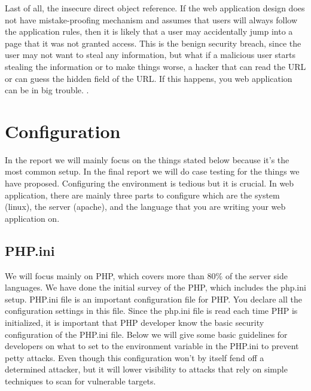 \documentclass[conference]{IEEEtran}
\begin{document}
Last of all, the insecure direct object reference. If the web application design does not have mistake-proofing mechanism and assumes that users will always follow the application rules, 
then it is likely that a user may accidentally jump into a page that it was not granted access. This is the benign security breach, since the user may not want to steal any information, 
but what if a malicious user starts stealing the information or to make things worse, a hacker that can read the URL or can guess the hidden field of the URL\cite{Michael}. 
If this happens, you web application can be in big trouble.  \cite{Test}.

\section{Configuration}
In the report we will mainly focus on the things stated below
because it's the most common setup. In the final report we will do case testing for the things we have proposed.
Configuring the environment is tedious but it is crucial. In web application, there are mainly three parts to configure
which are the system (linux), the server (apache), and the language that you are writing your web application on.

%


\subsection{PHP.ini}
We will focus mainly on PHP, which covers more than $80\%$ \cite{PHPusuage} of the server side languages. We have done the initial
survey of the PHP, which includes the php.ini setup.
PHP.ini file is an important configuration file for PHP. You declare all the configuration settings in this file. Since the php.ini file is read each time PHP is initialized, it is important that
PHP developer know the basic security configuration of the PHP.ini file. Below we will give some basic guidelines for developers on what to set to the environment variable in the PHP.ini
to prevent petty attacks. Even though this configuration won't by itself fend off a determined attacker, but it will lower visibility to attacks that rely on simple techniques to scan for vulnerable targets\cite{phpini}.
 
\end{document}
